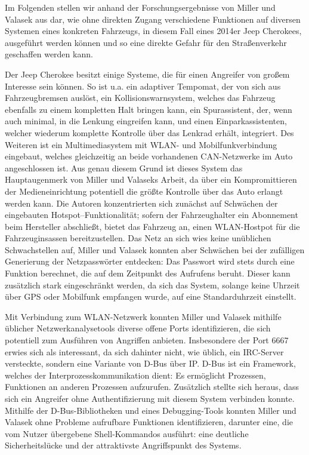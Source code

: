 \documentclass[
    fontsize=12pt,
    headings=small,
    parskip=half,           %
    bibliography=totoc,
    numbers=noenddot,       %
    open=any,               %
    ]{scrreprt}
\begin{document}
Im Folgenden stellen wir anhand der Forschungsergebnisse von Miller und Valasek aus \cite{MiV15} dar, wie ohne direkten Zugang verschiedene Funktionen auf diversen Systemen eines konkreten Fahrzeugs, in diesem Fall eines 2014er Jeep Cherokees, ausgeführt werden können und so eine direkte Gefahr für den Straßenverkehr geschaffen werden kann. \par
Der Jeep Cherokee besitzt einige Systeme, die für einen Angreifer von großem Interesse sein können. So ist u.a. ein adaptiver Tempomat, der von sich aus Fahrzeugbremsen auslöst, ein Kollisionswarnsystem, welches das Fahrzeug ebenfalls zu einem kompletten Halt bringen kann, ein Spurassistent, der, wenn auch minimal, in die Lenkung eingreifen kann, und einen Einparkassistenten, welcher wiederum komplette Kontrolle über das Lenkrad erhält, integriert. Des Weiteren ist ein Multimediasystem mit WLAN- und Mobilfunkverbindung eingebaut, welches gleichzeitig an beide vorhandenen CAN-Netzwerke im Auto angeschlossen ist. Aus genau diesem Grund ist dieses System das Hauptaugenmerk von Miller und Valaseks Arbeit, da über ein Kompromittieren der Medieneinrichtung potentiell die größte Kontrolle über das Auto erlangt werden kann. Die Autoren konzentrierten sich zunächst auf Schwächen der eingebauten Hotspot--Funktionalität; sofern der Fahrzeughalter ein Abonnement beim Hersteller abschließt, bietet das Fahrzeug an, einen WLAN-Hostpot für die Fahrzeuginsassen bereitzustellen. Das Netz an sich wies keine unüblichen Schwachstellen auf, Miller und Valasek konnten aber Schwächen bei der zufälligen Generierung der Netzpasswörter entdecken: Das Passwort wird stets durch eine Funktion berechnet, die auf dem Zeitpunkt des Aufrufens beruht. Dieser kann zusätzlich stark eingeschränkt werden, da sich das System, solange keine Uhrzeit über GPS oder Mobilfunk empfangen wurde, auf eine Standarduhrzeit einstellt. \par
Mit Verbindung zum WLAN-Netzwerk konnten Miller und Valasek mithilfe üblicher Netzwerkanalysetools diverse offene Ports identifizieren, die sich potentiell zum Ausführen von Angriffen anbieten. Insbesondere der Port 6667 erwies sich als interessant, da sich dahinter nicht, wie üblich, ein IRC-Server versteckte, sondern eine Variante von D-Bus über IP. D-Bus ist ein Framework, welches der Interprozesskommunikation dient: Es ermöglicht Prozessen, Funktionen an anderen Prozessen aufzurufen. Zusätzlich stellte sich heraus, dass sich ein Angreifer ohne Authentifizierung mit diesem System verbinden konnte. Mithilfe der D-Bus-Bibliotheken und eines Debugging-Tools konnten Miller und Valasek ohne Probleme aufrufbare Funktionen identifizieren, darunter eine, die vom Nutzer übergebene Shell-Kommandos ausführt: eine deutliche Sicherheitslücke und der attraktivste Angriffspunkt des Systems. \par
\end{document}

